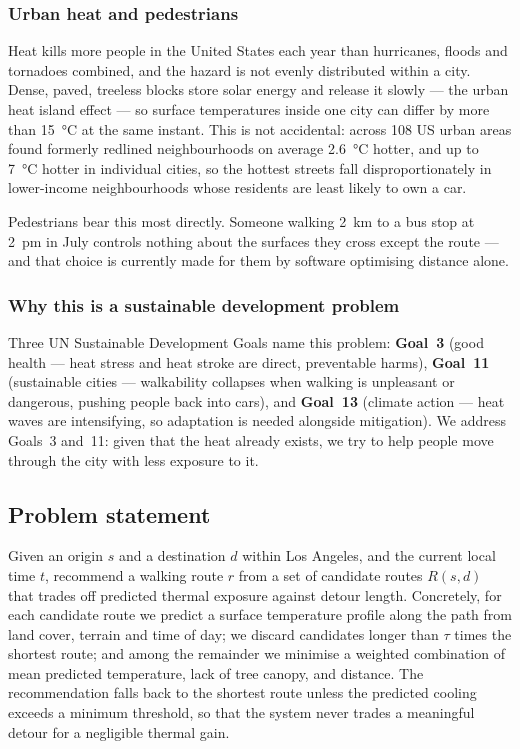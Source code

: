\documentclass[10pt]{article}   %
\begin{document}
\subsubsection{Urban heat and pedestrians}
Heat kills more people in the United States each year than hurricanes, floods and tornadoes
combined, and the hazard is not evenly distributed within a city. Dense, paved, treeless
blocks store solar energy and release it slowly --- the urban heat island effect --- so
surface temperatures inside one city can differ by more than \SI{15}{\celsius} at the same
instant. This is not accidental: across 108 US urban areas \citet{hoffman2020redlining}
found formerly redlined neighbourhoods on average \SI{2.6}{\celsius} hotter, and up to
\SI{7}{\celsius} hotter in individual cities, so the hottest streets fall disproportionately
in lower-income neighbourhoods whose residents are least likely to own a car.

Pedestrians bear this most directly. Someone walking \SI{2}{\kilo\metre} to a bus stop at
2~pm in July controls nothing about the surfaces they cross except the route --- and that
choice is currently made for them by software optimising distance alone.

\subsubsection{Why this is a sustainable development problem}
Three UN Sustainable Development Goals name this problem: \textbf{Goal~3} (good health ---
heat stress and heat stroke are direct, preventable harms), \textbf{Goal~11} (sustainable
cities --- walkability collapses when walking is unpleasant or dangerous, pushing people
back into cars), and \textbf{Goal~13} (climate action --- heat waves are intensifying, so
adaptation is needed alongside mitigation). We address Goals~3 and~11: given that the heat
already exists, we try to help people move through the city with less exposure to it.

\subsection{Problem statement}
Given an origin $s$ and a destination $d$ within Los Angeles, and the current local time $t$,
recommend a walking route $r$ from a set of candidate routes $R(s,d)$ that trades off
predicted thermal exposure against detour length. Concretely, for each candidate route we
predict a surface temperature profile along the path from land cover, terrain and time of
day; we discard candidates longer than $\tau$ times the shortest route; and among the
remainder we minimise a weighted combination of mean predicted temperature, lack of tree
canopy, and distance. The recommendation falls back to the shortest route unless the
predicted cooling exceeds a minimum threshold, so that the system never trades a meaningful
detour for a negligible thermal gain.
\end{document}
